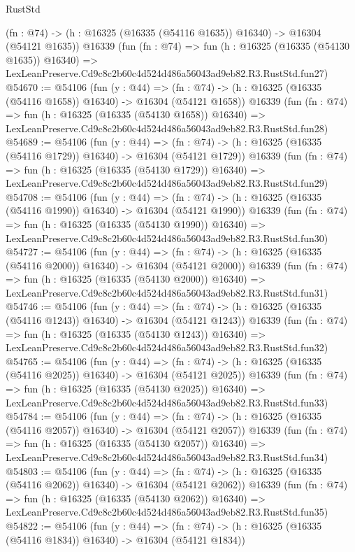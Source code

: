 \begin{lexlean}{RustStd}
\begin{coremodule}
    (fn : @74) -> (h : @16325 (@16335 (@54116 @1635)) @16340) -> @16304 (@54121 @1635))
    @16339
    (fun (fn : @74) =>
    fun (h : @16325 (@16335 (@54130 @1635)) @16340) =>
    LexLeanPreserve.Cd9c8c2b60c4d524d486a56043ad9eb82.R3.RustStd.fun27)
@54670 := @54106
    (fun (y : @44) =>
    (fn : @74) -> (h : @16325 (@16335 (@54116 @1658)) @16340) -> @16304 (@54121 @1658))
    @16339
    (fun (fn : @74) =>
    fun (h : @16325 (@16335 (@54130 @1658)) @16340) =>
    LexLeanPreserve.Cd9c8c2b60c4d524d486a56043ad9eb82.R3.RustStd.fun28)
@54689 := @54106
    (fun (y : @44) =>
    (fn : @74) -> (h : @16325 (@16335 (@54116 @1729)) @16340) -> @16304 (@54121 @1729))
    @16339
    (fun (fn : @74) =>
    fun (h : @16325 (@16335 (@54130 @1729)) @16340) =>
    LexLeanPreserve.Cd9c8c2b60c4d524d486a56043ad9eb82.R3.RustStd.fun29)
@54708 := @54106
    (fun (y : @44) =>
    (fn : @74) -> (h : @16325 (@16335 (@54116 @1990)) @16340) -> @16304 (@54121 @1990))
    @16339
    (fun (fn : @74) =>
    fun (h : @16325 (@16335 (@54130 @1990)) @16340) =>
    LexLeanPreserve.Cd9c8c2b60c4d524d486a56043ad9eb82.R3.RustStd.fun30)
@54727 := @54106
    (fun (y : @44) =>
    (fn : @74) -> (h : @16325 (@16335 (@54116 @2000)) @16340) -> @16304 (@54121 @2000))
    @16339
    (fun (fn : @74) =>
    fun (h : @16325 (@16335 (@54130 @2000)) @16340) =>
    LexLeanPreserve.Cd9c8c2b60c4d524d486a56043ad9eb82.R3.RustStd.fun31)
@54746 := @54106
    (fun (y : @44) =>
    (fn : @74) -> (h : @16325 (@16335 (@54116 @1243)) @16340) -> @16304 (@54121 @1243))
    @16339
    (fun (fn : @74) =>
    fun (h : @16325 (@16335 (@54130 @1243)) @16340) =>
    LexLeanPreserve.Cd9c8c2b60c4d524d486a56043ad9eb82.R3.RustStd.fun32)
@54765 := @54106
    (fun (y : @44) =>
    (fn : @74) -> (h : @16325 (@16335 (@54116 @2025)) @16340) -> @16304 (@54121 @2025))
    @16339
    (fun (fn : @74) =>
    fun (h : @16325 (@16335 (@54130 @2025)) @16340) =>
    LexLeanPreserve.Cd9c8c2b60c4d524d486a56043ad9eb82.R3.RustStd.fun33)
@54784 := @54106
    (fun (y : @44) =>
    (fn : @74) -> (h : @16325 (@16335 (@54116 @2057)) @16340) -> @16304 (@54121 @2057))
    @16339
    (fun (fn : @74) =>
    fun (h : @16325 (@16335 (@54130 @2057)) @16340) =>
    LexLeanPreserve.Cd9c8c2b60c4d524d486a56043ad9eb82.R3.RustStd.fun34)
@54803 := @54106
    (fun (y : @44) =>
    (fn : @74) -> (h : @16325 (@16335 (@54116 @2062)) @16340) -> @16304 (@54121 @2062))
    @16339
    (fun (fn : @74) =>
    fun (h : @16325 (@16335 (@54130 @2062)) @16340) =>
    LexLeanPreserve.Cd9c8c2b60c4d524d486a56043ad9eb82.R3.RustStd.fun35)
@54822 := @54106
    (fun (y : @44) =>
    (fn : @74) -> (h : @16325 (@16335 (@54116 @1834)) @16340) -> @16304 (@54121 @1834))

\end{coremodule}
\end{lexlean}
